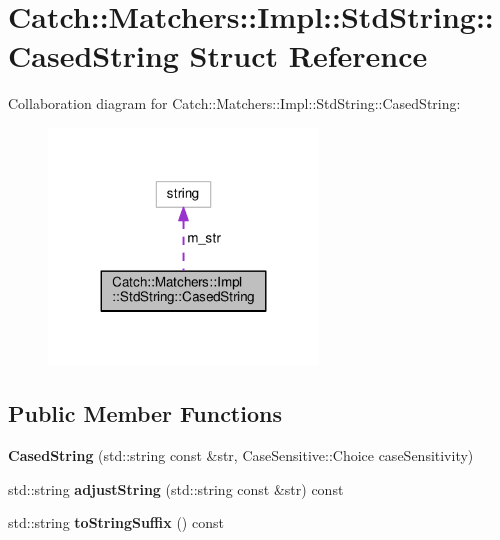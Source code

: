 \hypertarget{structCatch_1_1Matchers_1_1Impl_1_1StdString_1_1CasedString}{}\section{Catch\+:\+:Matchers\+:\+:Impl\+:\+:Std\+String\+:\+:Cased\+String Struct Reference}
\label{structCatch_1_1Matchers_1_1Impl_1_1StdString_1_1CasedString}


Collaboration diagram for Catch\+:\+:Matchers\+:\+:Impl\+:\+:Std\+String\+:\+:Cased\+String\+:
\nopagebreak
\begin{figure}[H]
\begin{center}
\leavevmode
\includegraphics[width=203pt]{structCatch_1_1Matchers_1_1Impl_1_1StdString_1_1CasedString__coll__graph}
\end{center}
\end{figure}
\subsection*{Public Member Functions}
\begin{DoxyCompactItemize}
\item 
{\bfseries Cased\+String} (std\+::string const \&str, Case\+Sensitive\+::\+Choice case\+Sensitivity)\hypertarget{structCatch_1_1Matchers_1_1Impl_1_1StdString_1_1CasedString_aebd017c88423d8a11c62cff85754a22d}{}\label{structCatch_1_1Matchers_1_1Impl_1_1StdString_1_1CasedString_aebd017c88423d8a11c62cff85754a22d}

\item 
std\+::string {\bfseries adjust\+String} (std\+::string const \&str) const \hypertarget{structCatch_1_1Matchers_1_1Impl_1_1StdString_1_1CasedString_aaf5c4be8b3b8b317777d0e332d3733b5}{}\label{structCatch_1_1Matchers_1_1Impl_1_1StdString_1_1CasedString_aaf5c4be8b3b8b317777d0e332d3733b5}

\item 
std\+::string {\bfseries to\+String\+Suffix} () const \hypertarget{structCatch_1_1Matchers_1_1Impl_1_1StdString_1_1CasedString_ae5865fa1dd20c80498a094cae5459883}{}\label{structCatch_1_1Matchers_1_1Impl_1_1StdString_1_1CasedString_ae5865fa1dd20c80498a094cae5459883}

\end{DoxyCompactItemize}
